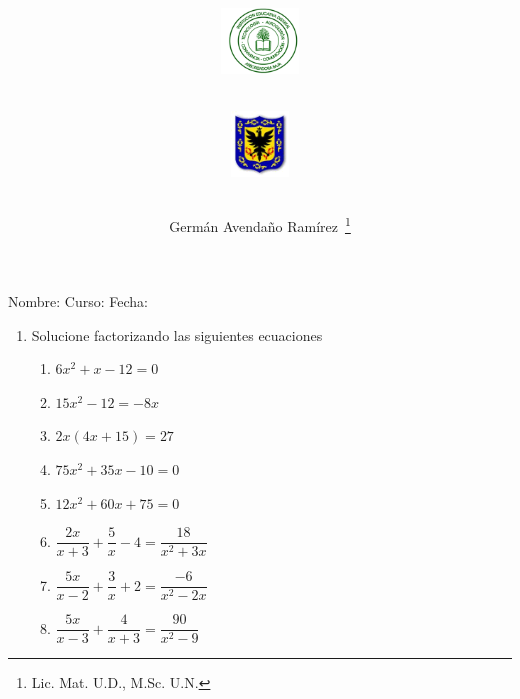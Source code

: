 \documentclass[letterpaper,11pt,twoside]{article}
\author{Germ\'an Avenda\~no Ram\'irez~\thanks{Lic. Mat. U.D., M.Sc. U.N.}}
\title{\begin{minipage}{.2\textwidth}
\includegraphics[height=1.75cm]{Images/logo-colegio.png}\end{minipage}
\begin{minipage}{.55\textwidth}
\begin{center}
\end{center}
\end{minipage}\hfill
\begin{minipage}{.2\textwidth}
\includegraphics[height=1.75cm]{Images/logo-sed.png} 
\end{minipage}}
\date{}
\begin{document}
\maketitle
Nombre: \hrulefill Curso: \underline{\hspace*{44pt}} Fecha: \underline{\hspace*{2.5cm}}
\begin{multicols}{2}
 \begin{enumerate}
  \item Solucione factorizando las siguientes ecuaciones
 \begin{enumerate}
 \item $6x^{2}+x-12=0$
 \item $15x^{2}-12=-8x$
 \item $2x(4x+15)=27$
 \item $75x^{2}+35x-10=0$
 \item $12x^{2}+60x+75=0$
 \item $\dfrac{2x}{x+3}+\dfrac{5}{x}-4=\dfrac{18}{x^{2}+3x}$
 \item $\dfrac{5x}{x-2}+\dfrac{3}{x}+2=\dfrac{-6}{x^{2}-2x}$
 \item $\dfrac{5x}{x-3}+\dfrac{4}{x+3}=\dfrac{90}{x^{2}-9}$
 \end{enumerate}
 \end{enumerate}
\end{multicols}
\end{document}
